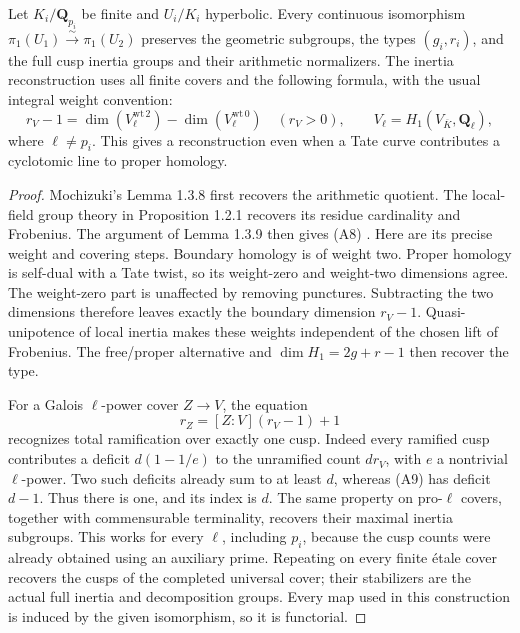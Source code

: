\begin{proposition}
\label{A:padic-cusp-reconstruction}
Let $K_i/\mathbf Q_{p_i}$ be finite and $U_i/K_i$
hyperbolic.  Every continuous isomorphism
$\pi_1(U_1)\xrightarrow{\sim}\pi_1(U_2)$ preserves
the geometric subgroups, the types $(g_i,r_i)$, and
the full cusp inertia groups and their arithmetic
normalizers.  The inertia reconstruction uses all
finite covers and the following formula, with the
usual integral weight convention:
\[
 r_V-1=\dim(V_\ell^{\mathrm{wt}\,2})
            -\dim(V_\ell^{\mathrm{wt}\,0})
 \quad(r_V>0),
 \qquad V_\ell=H_1(V_{\overline K},\mathbf Q_\ell),
                                                               \tag{A8}
\]
where $\ell\ne p_i$.  This gives a reconstruction even
when a Tate curve contributes a cyclotomic line to
proper homology.
\end{proposition}
\begin{proof}
Mochizuki's Lemma 1.3.8 first recovers the arithmetic
quotient.  The local-field group theory in Proposition
1.2.1 recovers its residue cardinality and Frobenius.
The argument of Lemma 1.3.9 then gives (A8)
\cite{A_Mochizuki2004}.  Here are its precise weight
and covering steps.  Boundary homology is of weight
two.  Proper homology is self-dual with a Tate twist,
so its weight-zero and weight-two dimensions agree.
The weight-zero part is unaffected by removing
punctures.  Subtracting the two dimensions therefore
leaves exactly the boundary dimension $r_V-1$.
Quasi-unipotence of local inertia makes these weights
independent of the chosen lift of Frobenius.  The
free/proper alternative and
$\dim H_1=2g+r-1$ then recover the type.

For a Galois $\ell$-power cover $Z\to V$, the equation
\[
          r_Z=[Z:V](r_V-1)+1                              \tag{A9}
\]
recognizes total ramification over exactly one cusp.
Indeed every ramified cusp contributes a deficit
$d(1-1/e)$ to the unramified count $dr_V$, with
$e$ a nontrivial $\ell$-power.  Two such deficits
already sum to at least $d$, whereas (A9) has
deficit $d-1$.  Thus there is one, and its index
is $d$.  The same property on pro-$\ell$ covers,
together with commensurable terminality, recovers
their maximal inertia subgroups.  This works for
every $\ell$, including $p_i$, because the cusp
counts were already obtained using an auxiliary
prime.  Repeating on every finite \'etale cover
recovers the cusps of the completed universal
cover; their stabilizers are the actual full
inertia and decomposition groups.  Every map
used in this construction is induced by the
given isomorphism, so it is functorial.
\end{proof}

